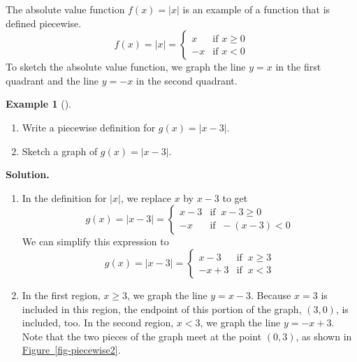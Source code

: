 \documentclass[10pt,]{book}
\theoremstyle{plain}
\theoremstyle{definition}
\theoremstyle{definition}
\newtheorem{example}[theorem]{Example}
\numberwithin{equation}{section}
\newcommand\abs[1]{\left|#1\right|}
\newcommand{\lt}{ < }
\newcommand{\amp}{ & }
\begin{document}
    The absolute value function \(f (x) = \abs{x}\) is an example of a function that is defined piecewise.
    \begin{equation*}
        f (x) =\abs{x} =
        \begin{cases}
        x \amp \text{if } x\ge 0\\
        -x  \amp \text{if } x\lt 0
        \end{cases}
    \end{equation*}
    To sketch the absolute value function, we graph the line \(y = x\) in the first quadrant and the line \(y = −x\) in the second quadrant.
%
\begin{example}[]\label{example-piecewise-def}
\leavevmode%
\begin{enumerate}[label=*\alph**]
\item\hypertarget{li-280}{}Write a piecewise definition for \(g(x) = \abs{x − 3}\).\item\hypertarget{li-281}{}Sketch a graph of \(g(x) = \abs{x − 3}\).\end{enumerate}
\par\medskip\noindent%
\textbf{Solution.}\quad \leavevmode%
\begin{enumerate}[label=*\alph**]
\item\hypertarget{li-282}{}In the definition for \(\abs{x}\), we replace \(x\) by \(x − 3\) to get
            \begin{equation*}
                g(x) =\abs{x-3} =
                \begin{cases}
                x-3 \amp \text{if }~ x-3\ge 0\\
                -x  \amp \text{if }~ -(x-3)\lt 0
                \end{cases}
            \end{equation*}
        We can simplify this expression to
            \begin{equation*}
                g(x) =\abs{x-3} =
                \begin{cases}
                x-3 \amp \text{if }~ x\ge 3\\
                -x+3  \amp \text{if }~ x\lt 3
                \end{cases}
            \end{equation*}\item\hypertarget{li-283}{}
            In the first region, \(x \ge 3\), we graph the line \(y = x − 3\). Because \(x = 3\) is included in this region, the endpoint of this portion of the graph, \((3, 0)\), is included, too. In the second region, \(x \lt 3\), we graph the line \(y = −x + 3\). Note that the two pieces of the graph meet at the point \((0, 3)\), as shown in \hyperref[fig-piecewise2]{Figure~\ref{fig-piecewise2}}.

\end{enumerate}
\end{example}
\end{document}

